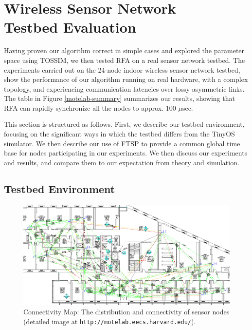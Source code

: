 \section{Wireless Sensor Network\\ Testbed Evaluation}
\label{sec-motes}

Having proven our algorithm correct in simple cases and explored the
parameter space using TOSSIM, we then tested RFA on a real sensor
network testbed. The experiments carried out on the 24-node indoor
wireless sensor network testbed, show the performance of our algorithm
running on real hardware, with a complex topology, and experiencing
communication latencies over lossy asymmetric links. The table in
Figure \ref{motelab-summary} summarizes our results, showing that RFA
can rapidly synchronize all the nodes to approx. 100 $\mu$sec.

This section is structured as follows.  First, we describe our testbed
environment, focusing on the significant ways in which the testbed
differs from the TinyOS simulator.  We then describe our use of FTSP
to provide a common global time base for nodes participating in our
experiments. We then discuss our experiments and results, and compare
them to our expectation from theory and simulation.


\subsection{Testbed Environment}

\begin{figure}
\begin{center}
\includegraphics[width=0.85\hsize]{./figures/motelab-map.png}
\end{center}
\caption{Connectivity Map: The distribution and connectivity of sensor
nodes (detailed image at {\tt http://motelab.eecs.harvard.edu/}).}
\label{connectivity-map}
\end{figure}

